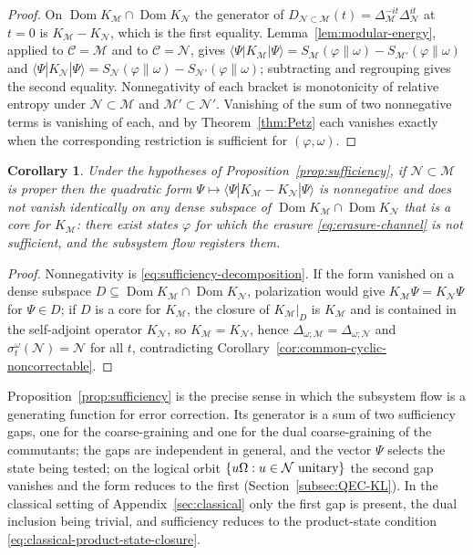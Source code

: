 \documentclass[a4paper,11pt]{article}
\newtheorem{corollary}[theorem]{Corollary}
\theoremstyle{definition}
\newcommand{\mN}{\mathcal{N}}
\newcommand{\mM}{\mathcal{M}}
\begin{document}
\begin{proof}
On $\operatorname{Dom}K_{\mM}\cap\operatorname{Dom}K_{\mN}$ the generator of $D_{\mN\subset\mM}(t)=\Delta_{\mM}^{-it}\Delta_{\mN}^{it}$ at $t=0$ is $K_{\mM}-K_{\mN}$, which is the first equality. Lemma~\ref{lem:modular-energy}, applied to $\mathcal C=\mM$ and to $\mathcal C=\mN$, gives $\langle\Psi|K_{\mM}|\Psi\rangle=S_{\mM}(\varphi\|\omega)-S_{\mM'}(\varphi\|\omega)$ and $\langle\Psi|K_{\mN}|\Psi\rangle=S_{\mN}(\varphi\|\omega)-S_{\mN'}(\varphi\|\omega)$; subtracting and regrouping gives the second equality. Nonnegativity of each bracket is monotonicity of relative entropy under $\mN\subset\mM$ and $\mM'\subset\mN'$. Vanishing of the sum of two nonnegative terms is vanishing of each, and by Theorem~\ref{thm:Petz} each vanishes exactly when the corresponding restriction is sufficient for $(\varphi,\omega)$.
\end{proof}

\begin{corollary}\label{cor:positive-generator}
Under the hypotheses of Proposition~\ref{prop:sufficiency}, if $\mN\subset\mM$ is proper then the quadratic form $\Psi\mapsto\langle\Psi|K_{\mM}-K_{\mN}|\Psi\rangle$ is nonnegative and does not vanish identically on any dense subspace of $\operatorname{Dom}K_{\mM}\cap\operatorname{Dom}K_{\mN}$ that is a core for $K_{\mM}$: there exist states $\varphi$ for which the erasure \eqref{eq:erasure-channel} is not sufficient, and the subsystem flow registers them.
\end{corollary}
\begin{proof}
Nonnegativity is \eqref{eq:sufficiency-decomposition}. If the form vanished on a dense subspace $D\subseteq\operatorname{Dom}K_{\mM}\cap\operatorname{Dom}K_{\mN}$, polarization would give $K_{\mM}\Psi=K_{\mN}\Psi$ for $\Psi\in D$; if $D$ is a core for $K_{\mM}$, the closure of $K_{\mM}|_D$ is $K_{\mM}$ and is contained in the self-adjoint operator $K_{\mN}$, so $K_{\mM}=K_{\mN}$, hence $\Delta_{\omega;\mM}=\Delta_{\omega;\mN}$ and $\sigma^{\omega}_t(\mN)=\mN$ for all $t$, contradicting Corollary~\ref{cor:common-cyclic-noncorrectable}.
\end{proof}

Proposition~\ref{prop:sufficiency} is the precise sense in which the subsystem flow is a generating function for error correction. Its generator is a sum of two sufficiency gaps, one for the coarse-graining and one for the dual coarse-graining of the commutants; the gaps are independent in general, and the vector $\Psi$ selects the state being tested; on the logical orbit $\{u\Omega:u\in\mN\ \hbox{unitary}\}$ the second gap vanishes and the form reduces to the first (Section~\ref{subsec:QEC-KL}). In the classical setting of Appendix~\ref{sec:classical} only the first gap is present, the dual inclusion being trivial, and sufficiency reduces to the product-state condition \eqref{eq:classical-product-state-closure}.
\end{document}
